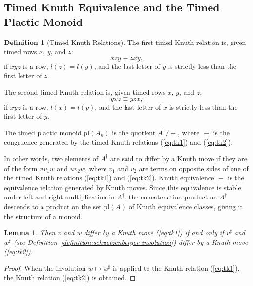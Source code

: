 \documentclass[12pt]{amsart}
\newtheorem{lemma}[theorem]{Lemma}
\theoremstyle{definition}
\newtheorem{definition}[theorem]{Definition}
\newcommand{\pl}{\mathrm{pl}}
\begin{document}
\subsection{Timed Knuth Equivalence and the Timed Plactic Monoid}
\begin{definition}
  [Timed Knuth Relations]
  \label{sec:timed-knuth-equiv}
  The first timed Knuth relation is, given timed rows $x$, $y$, and $z$:
  \begin{equation}
    \tag{$\kappa_1$}
    \label{eq:tk1}
    xzy \equiv zxy,
  \end{equation}
  if $xyz$ is a row, $l(z) = l(y)$, and the last letter of $y$ is strictly less than the first letter of $z$.

  The second timed Knuth relation is, given timed rows $x$, $y$, and $z$:
  \begin{equation}
    \tag{$\kappa_2$}
    \label{eq:tk2}
    yxz \equiv yzx,
  \end{equation}
  if $xyz$ is a row, $l(x)=l(y)$, and the last letter of $x$ is strictly less than the first letter of $y$.

  The timed plactic monoid $\pl(A_n)$ is the quotient $A^\dagger/\equiv$, where $\equiv$ is the congruence generated by the timed Knuth relations (\ref{eq:tk1}) and (\ref{eq:tk2}).
\end{definition}
In other words, two elements of $A^\dagger$ are said to differ by a Knuth move if they are of the form $uv_1w$ and $uv_2w$, where $v_1$ and $v_2$ are terms on opposite sides of one of the timed Knuth relations (\ref{eq:tk1}) and (\ref{eq:tk2}).
Knuth equivalence $\equiv$ is the equivalence relation generated by Knuth moves.
Since this equivalence is stable under left and right multiplication in $A^\dagger$, the concatenation product on $A^\dagger$ descends to a product on the set $\pl(A)$ of Knuth equivalence classes, giving it the structure of a monoid.
\begin{lemma}
  \label{lemma:sharp-moves}
  Then $v$ and $w$ differ by a Knuth move (\ref{eq:tk1}) if and only if $v^\sharp$ and $w^\sharp$ (see Definition~\ref{definition:schuetzenberger-involution}) differ by a Knuth move (\ref{eq:tk2}).
\end{lemma}
\begin{proof}
  When the involution $w\mapsto w^\sharp$ is applied to the Knuth relation (\ref{eq:tk1}), the Knuth relation (\ref{eq:tk2}) is obtained.
\end{proof}
\end{document}
